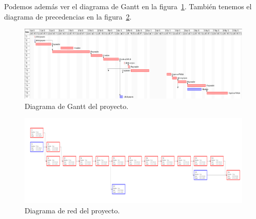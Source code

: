 Podemos además ver el diagrama de Gantt en la figura~\ref{fig:gantt}. También tenemos el diagrama de
precedencias en la figura~\ref{fig:web}.

\begin{figure}
	\centering
	\includegraphics[width=\textheight, angle=-90]{fig/gantt}
	\caption{Diagrama de Gantt del proyecto.}\label{fig:gantt}
\end{figure}

\begin{figure}
	\centering
	\includegraphics[width=\textheight, angle=-90]{fig/web}
	\caption{Diagrama de red del proyecto.}\label{fig:web}
\end{figure}
